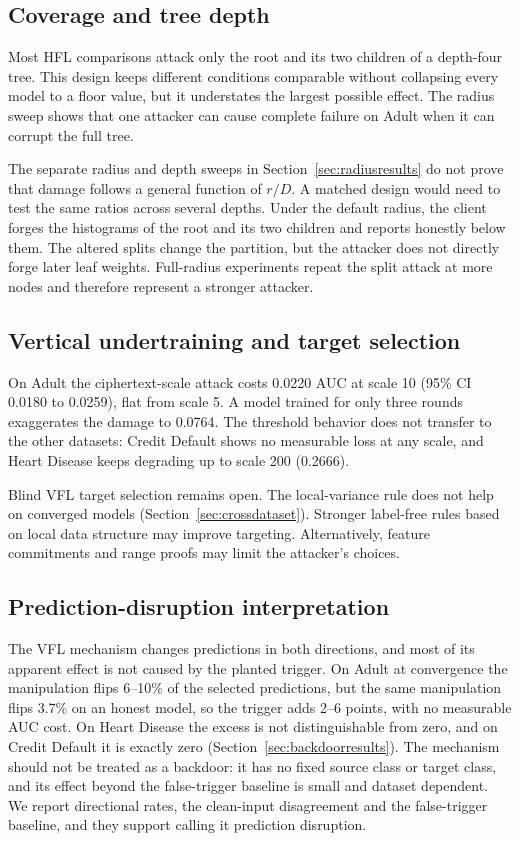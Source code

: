 \documentclass[11pt]{article}
\newcommand{\rev}[1]{#1}
\begin{document}
\subsection{Coverage and tree depth}

Most HFL comparisons attack \rev{only the root and its two children} of a depth-four tree. This design keeps different conditions comparable without collapsing every model to a floor value, but it understates the largest possible effect. The radius sweep shows that one attacker can cause complete failure on Adult when it can corrupt the full tree.

The separate radius and depth sweeps in Section~\ref{sec:radiusresults} do not prove that damage follows a general function of $r/D$. A matched design would need to test the same ratios across several depths. \rev{Under the default radius, the client forges the histograms of the root and its two children and reports honestly below them.} The altered \rev{splits change} the partition, but the attacker does not directly forge later leaf weights. Full-radius experiments repeat the split attack at more nodes and therefore represent a stronger attacker.

\subsection{Vertical undertraining and target selection}

\rev{On Adult the ciphertext-scale attack costs 0.0220 AUC at scale 10 (95\% CI 0.0180 to 0.0259), flat from scale 5. A model trained for only three rounds exaggerates the damage to 0.0764. The threshold behavior does not transfer to the other datasets: Credit Default shows no measurable loss at any scale, and Heart Disease keeps degrading up to scale 200 (0.2666).}

\rev{Blind VFL target selection remains open. The local-variance rule does not help on converged models (Section~\ref{sec:crossdataset}). Stronger label-free rules based on local data structure may improve targeting. Alternatively, feature commitments and range proofs may limit the attacker's choices.}

\subsection{\rev{Prediction-disruption interpretation}}

\rev{The VFL mechanism changes predictions in both directions, and most of its apparent effect is not caused by the planted trigger. On Adult at convergence the manipulation flips 6--10\% of the selected predictions, but the same manipulation flips 3.7\% on an honest model, so the trigger adds 2--6 points, with no measurable AUC cost. On Heart Disease the excess is not distinguishable from zero, and on Credit Default it is exactly zero (Section~\ref{sec:backdoorresults}). The mechanism should not be treated as a backdoor: it has no fixed source class or target class, and its effect beyond the false-trigger baseline is small and dataset dependent. We report directional rates, the clean-input disagreement and the false-trigger baseline, and they support calling it prediction disruption.}
\end{document}
